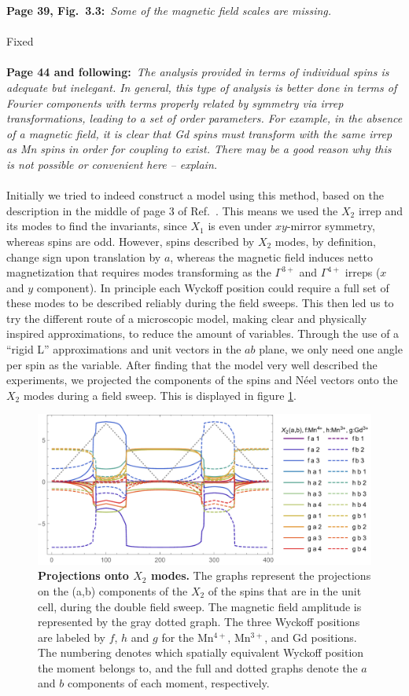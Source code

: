 \documentclass[phd, titlesmallcaps,foronline,oneside]{SNSthesis}
\begin{document}
{\bf Page 39, Fig.~3.3:}~{\it Some of the magnetic field scales are missing.}
\\\\
Fixed
\\\\
{\bf Page 44 and following:}~{\it The analysis provided in terms of individual spins is adequate but
inelegant. In general, this type of analysis is better done in terms of Fourier components with
terms properly related by symmetry via irrep transformations, leading to a set of order parameters.
For example, in the absence of a magnetic field, it is clear that Gd spins must transform with the
same irrep as Mn spins in order for coupling to exist. There may be a good reason why this is not
possible or convenient here – explain.}
\\\\
Initially we tried to indeed construct a model using this method, based on the description in the middle of page 3 of Ref.~\cite{Lee13}. This means we used the $X_2$ irrep and its modes to find the invariants, since $X_1$ is even under $xy$-mirror symmetry, whereas spins are odd.
However, spins described by $X_2$ modes, by definition, change sign upon translation by $a$, whereas the magnetic field induces netto magnetization that requires modes transforming as the $\Gamma^{3+}$ and $\Gamma^{4+}$ irreps ($x$ and $y$ component).
In principle each Wyckoff position could require a full set of these modes to be described reliably during the field sweeps.
This then led us to try the different route of a microscopic model, making clear and physically inspired approximations, to reduce the amount of variables. 
Through the use of a ``rigid L'' approximations and unit vectors in the $ab$ plane, we only need one angle per spin as the variable.
After finding that the model very well described the experiments, we projected the components of the spins and N\'eel vectors onto the $X_2$ modes during a field sweep. This is displayed in figure \ref{allirreps}.
\begin{figure}[h]
	\includegraphics[width=\textwidth]{allIrreps.pdf}
	\caption{\label{allirreps}{\bf Projections onto $X_2$ modes.} The graphs represent the projections on the (a,b) components of the $X_2$ of the spins that are in the unit cell, during the double field sweep. The magnetic field amplitude is represented by the gray dotted graph. The three Wyckoff positions are labeled by $f$, $h$ and $g$ for the Mn$^{4+}$, Mn$^{3+}$, and Gd positions. The numbering denotes which spatially equivalent Wyckoff position the moment belongs to, and the full and dotted graphs denote the $a$ and $b$ components of each moment, respectively.}
\end{figure}
\end{document}
